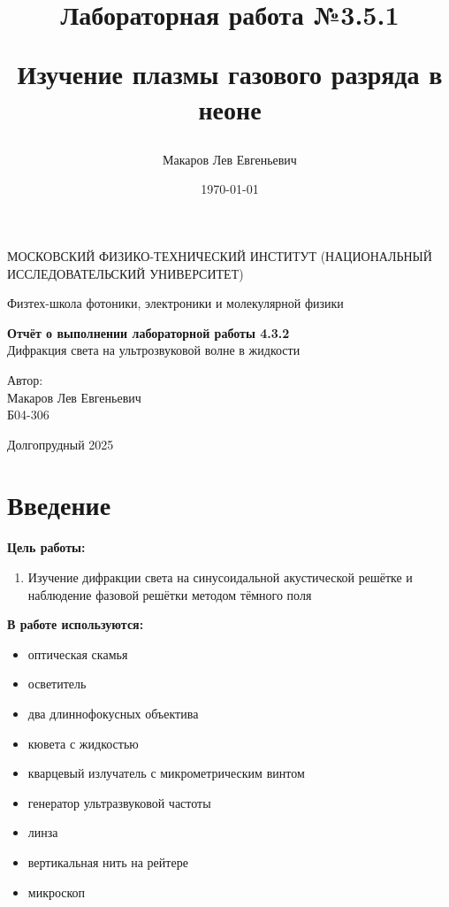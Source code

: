 \documentclass[a4paper,12pt]{article}
\author{Макаров Лев Евгеньевич}
\title{Лабораторная работа №3.5.1

Изучение плазмы газового разряда в неоне
}
\date{\today}
\begin{document}
\begin{titlepage}
	\begin{center}
		{\large МОСКОВСКИЙ ФИЗИКО-ТЕХНИЧЕСКИЙ ИНСТИТУТ (НАЦИОНАЛЬНЫЙ ИССЛЕДОВАТЕЛЬСКИЙ УНИВЕРСИТЕТ)}
	\end{center}
	\begin{center}
		{\large Физтех-школа фотоники, электроники и молекулярной физики}
	\end{center}
	
	
	\vspace{4.5cm}
	{\huge
		\begin{center}
			{\bf Отчёт о выполнении лабораторной работы 4.3.2}\\
			Дифракция света на ультрозвуковой волне в жидкости
		\end{center}
	}
	\vspace{2cm}
	\begin{flushright}
		{\LARGE Автор:\\ Макаров Лев Евгеньевич \\
			\vspace{0.2cm}
			Б04-306}
	\end{flushright}
	\vspace{8cm}
	\begin{center}
		Долгопрудный 2025
	\end{center}
\end{titlepage}

\section{Введение}

\textbf{Цель работы:} 
\begin{enumerate}
	\item Изучение дифракции света на синусоидальной акустической решётке и наблюдение фазовой решётки методом тёмного поля
\end{enumerate}

\textbf{В работе используются:} 
\begin{itemize}
    \item оптическая скамья
    \item осветитель
    \item два длиннофокусных объектива
    \item кювета с жидкостью
    \item кварцевый излучатель с микрометрическим винтом
    \item генератор ультразвуковой частоты
    \item линза
    \item вертикальная нить на рейтере
    \item микроскоп
\end{itemize}
\medskip
\end{document}
